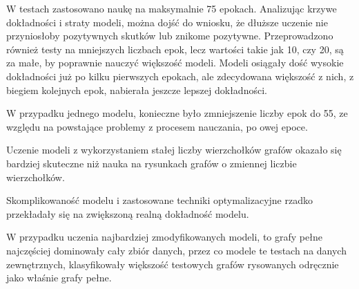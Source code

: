 W testach zastosowano naukę na maksymalnie 75 epokach.
Analizując krzywe dokładności i straty modeli, można dojść do wniosku,
że dłuższe uczenie nie przyniosłoby pozytywnych skutków lub znikome pozytywne.
Przeprowadzono również testy na mniejszych liczbach epok, lecz wartości takie jak 10, czy 20,
są za małe, by poprawnie nauczyć większość modeli.
Modeli osiągały dość wysokie dokładności już po kilku pierwszych epokach,
ale zdecydowana większość z nich, z biegiem kolejnych epok, nabierała jeszcze lepszej dokładności.

W przypadku jednego modelu, konieczne było zmniejszenie liczby epok do 55,
ze względu na powstające problemy z procesem nauczania, po owej epoce.

Uczenie modeli z wykorzystaniem stałej liczby wierzchołków grafów okazało się bardziej skuteczne
niż nauka na rysunkach grafów o zmiennej liczbie wierzchołków.

Skomplikowaność modelu i zastosowane techniki optymalizacyjne rzadko przekładały się na zwiększoną realną dokładność modelu.

W przypadku uczenia najbardziej zmodyfikowanych modeli, to grafy pełne najczęściej dominowały cały zbiór danych,
przez co modele te testach na danych zewnętrznych,
klasyfikowały większość testowych grafów rysowanych odręcznie jako właśnie grafy pełne.